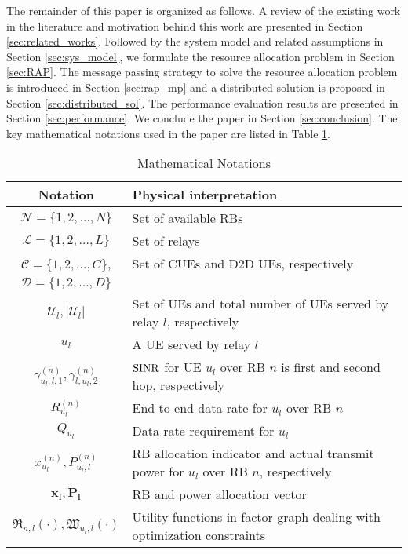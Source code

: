 \documentclass[twocolumn,10pt]{IEEEtran}
\begin{document}
The remainder of this paper is organized as follows. A review of
the existing work in the literature and motivation behind this work are presented in Section \ref{sec:related_works}. Followed by the system model and related assumptions in Section \ref{sec:sys_model}, we formulate the resource allocation problem in Section \ref{sec:RAP}. The message passing strategy to solve the resource allocation problem is introduced in Section \ref{sec:rap_mp} and a distributed solution is proposed in Section \ref{sec:distributed_sol}. The performance evaluation  results are presented in Section \ref{sec:performance}.  We conclude the paper in Section \ref{sec:conclusion}. The key mathematical notations used in the paper are listed in Table \ref{tab:notations_mp}.


\begin{table}[!t]
\renewcommand{\arraystretch}{1.3}
\caption{Mathematical Notations}
\label{tab:notations_mp}
\centering
\begin{tabular}{c|p{5.2cm}}
\hline
\bfseries Notation & \bfseries Physical interpretation\\
\hline\hline
$\mathcal{N} = \lbrace 1, 2, \ldots, N \rbrace $ & Set of available RBs \\
\hline $\mathcal{L} = \lbrace 1, 2, \ldots, L \rbrace$ & Set of relays \\
\hline $\mathcal{C} = \lbrace 1, 2, \ldots, C \rbrace $, & Set of CUEs and D2D UEs, respectively \\
$\mathcal{D} = \lbrace 1, 2, \ldots, D \rbrace $ & \\
\hline $\mathcal{U}_l, |\mathcal{U}_l|$ & Set of UEs and total number of UEs served by relay $l$, respectively \\
\hline $u_l$  & A UE served by relay $l$ \\
\hline $\gamma_{u_l, l, 1}^{(n)}, \gamma_{l, u_l, 2}^{(n)}$ & ${\rm SINR}$ for UE $u_l$ over RB $n$ is first and second hop, respectively \\
\hline $R_{u_l}^{(n)}$ & End-to-end data rate for $u_l$ over RB $n$ \\
\hline $Q_{u_l}$ & Data rate requirement for $u_l$\\
\hline $x_{u_l}^{(n)}, P_{u_l, l}^{(n)}$ & RB allocation indicator and actual transmit power for $u_l$ over RB $n$, respectively \\
\hline $\mathbf{x}_{\boldsymbol l}, \mathbf{P}_{\boldsymbol l}$ & RB and power allocation vector\\
\hline $\mathfrak{R}_{n,l}(\cdot), \mathfrak{W}_{u_l, l}(\cdot)$ & Utility functions in factor graph dealing with optimization constraints \\

\end{tabular}
\end{table}
\end{document}
